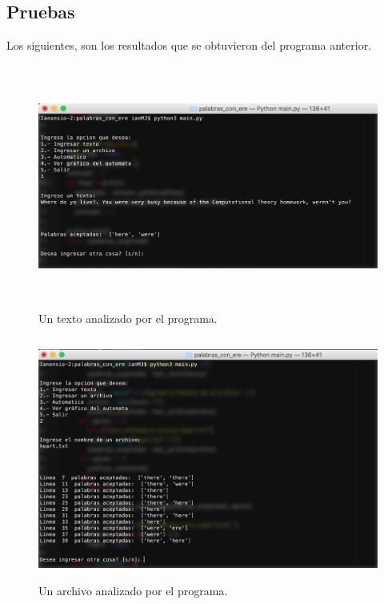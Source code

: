 \documentclass[12pt]{article}
\begin{document}
\begin{lstlisting}[frame=single]
\end{lstlisting}

\subsection{Pruebas}
Los siguientes, son los resultados que se obtuvieron del programa anterior.

\begin{figure}[H]
\includegraphics[width=\textwidth, height=8cm]{palabras_ere_texto}
\caption{Un texto analizado por el programa.}
\label{fig:automata_ere_texto}
\end{figure}

\begin{figure}[H]
\includegraphics[width=\textwidth, height=8cm]{palabras_ere_archivo}
\caption{Un archivo analizado por el programa.}
\label{fig:automata_ere_archivo}
\end{figure}
\end{document}
